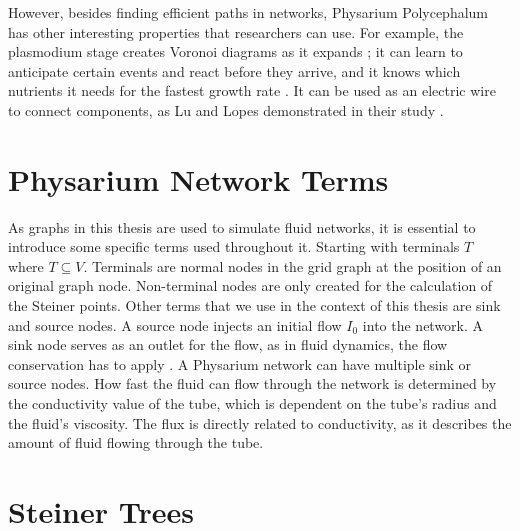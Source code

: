 However, besides finding efficient paths in networks, Physarium Polycephalum has other interesting properties that researchers can use. For example, the plasmodium stage creates Voronoi diagrams as it expands \cite{shirakawa_simultaneous_2009}; it can learn to anticipate certain events and react before they arrive, and it knows which nutrients it needs for the fastest growth rate \cite{jabr_how_2012}. It can be used as an electric wire to connect components, as Lu and Lopes demonstrated in their study \cite{lu_integrating_2022}.

\section{Physarium Network Terms}
\label{sec:network_terms}

As graphs in this thesis are used to simulate fluid networks, it is essential to introduce some specific terms used throughout it. Starting with terminals $T$ where $T \subseteq V$. Terminals are normal nodes in the grid graph at the position of an original graph node. Non-terminal nodes are only created for the calculation of the Steiner points. Other terms that we use in the context of this thesis are sink and source nodes. A source node injects an initial flow $I_0$ into the network. A sink node serves as an outlet for the flow, as in fluid dynamics, the flow conservation has to apply \cite{black_flow_2004}. A Physarium network can have multiple sink or source nodes. How fast the fluid can flow through the network is determined by the conductivity value of the tube, which is dependent on the tube's radius and the fluid's viscosity. The flux is directly related to conductivity, as it describes the amount of fluid flowing through the tube.

\section{Steiner Trees}
\label{sec:steinertrees}

